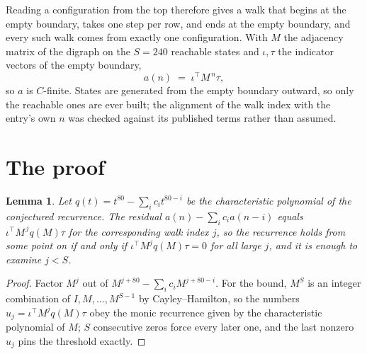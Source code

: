 \documentclass[11pt,a4paper]{article}
\theoremstyle{plain}
\newtheorem{lemma}[theorem]{Lemma}
\theoremstyle{definition}
\begin{document}
Reading a configuration from the top therefore gives a walk that begins at the empty boundary,
takes one step per row, and ends at the empty boundary, and every such walk comes from exactly
one configuration. With $M$ the adjacency matrix of the digraph on the $S=240$ reachable
states and $\iota,\tau$ the indicator vectors of the empty boundary,
\[
a(n)\;=\;\iota^{\!\top}M^{\,n}\tau ,
\]
so $a$ is $C$-finite. States are generated from the empty boundary outward, so only the
reachable ones are ever built; the alignment of the walk index with the entry's own $n$ was
checked against its published terms rather than assumed.

\section{The proof}

\begin{lemma}\label{lem:crit}
Let $q(t)=t^{80}-\sum_i c_it^{80-i}$ be the characteristic polynomial of the
conjectured recurrence. The residual $a(n)-\sum_ic_ia(n-i)$ equals
$\iota^{\!\top}M^{\,j}q(M)\tau$ for the corresponding walk index $j$, so the recurrence
holds from some point on if and only if $\iota^{\!\top}M^{j}q(M)\tau=0$ for all large $j$,
and it is enough to examine $j<S$.
\end{lemma}

\begin{proof}
Factor $M^{j}$ out of $M^{j+80}-\sum_ic_iM^{j+80-i}$. For the bound, $M^{S}$
is an integer combination of $I,M,\dots,M^{S-1}$ by Cayley--Hamilton, so the numbers
$u_j=\iota^{\!\top}M^{j}q(M)\tau$ obey the monic recurrence given by the characteristic
polynomial of $M$; $S$ consecutive zeros force every later one, and the last nonzero $u_j$
pins the threshold exactly.
\end{proof}
\end{document}
